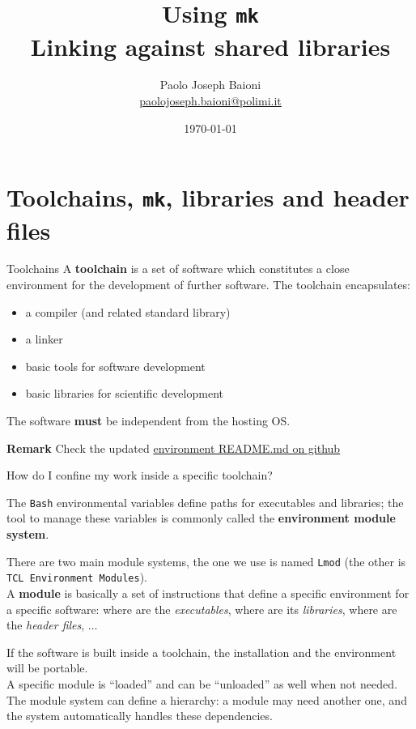 \documentclass[10pt,aspectratio=169]{beamer}
\begin{document}
\title{Using \texttt{mk}\\
  Linking against shared libraries}
\author{Paolo Joseph Baioni\\ \href{mailto:paolojoseph.baioni@polimi.it}{\color{blue}paolojoseph.baioni@polimi.it}}
\date{\today}

\begin{frame}
  \maketitle
\end{frame}

\section{Toolchains, \texttt{mk}, libraries and header files}

\begin{frame}{Toolchains}
    A \textbf{toolchain} is a set of software which constitutes a close environment for the development of further software.
    The toolchain encapsulates:
  \begin{itemize}
      \item a compiler (and related standard library)
  \item a linker
  \item basic tools for software development
  \item basic libraries for scientific development
  \end{itemize}	

    The software \textbf{must} be independent from the hosting OS.

    \vfill
    \textbf{Remark} Check the updated \href{https://github.com/pacs-course/pacs-Labs/tree/main/Labs/2025/00-environment_setup}{\color{blue}environment README.md on github}
\end{frame}

\begin{frame}{How do I confine my work inside a specific toolchain?}

    The \texttt{Bash} environmental variables define paths for executables and libraries; the tool to manage these variables is commonly called the \textbf{environment module system}.

  There are two main module systems, the one we use is named \texttt{Lmod} (the other is \texttt{TCL Environment Modules}).\\[3mm]

    A \textbf{module} is basically a set of instructions that define a specific environment for a specific software: where are the \textit{executables}, where are its \textit{libraries}, where are the \textit{header files}, $\dots$

    {If the software is built inside a toolchain, the installation and the environment  will be portable.} \\[3mm]

A specific module is “loaded” and can be “unloaded” as well when not needed.
The module system can define a hierarchy: a module may need another one, and the system automatically handles these dependencies.

\end{frame}
\end{document}
